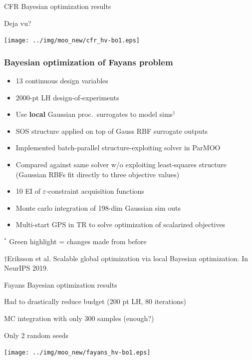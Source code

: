 \documentclass[aspectratio=169]{beamer}
\begin{document}
\begin{frame}{CFR Bayesian optimization results}

Deja vu?\\
\begin{center}
\texttt{[image: ../img/moo\_new/cfr\_hv-bo1.eps]}
\end{center}
\end{frame}

\begin{frame}\frametitle{Bayesian optimization of Fayans problem}
\begin{itemize}
\item 13 continuous design variables
\item 2000-pt LH design-of-experiments
\item Use {\bf local} Gaussian proc.\ surrogates to model sims$^\dagger$
\item SOS structure applied on top of Gauss RBF surrogate outputs
\item Implemented batch-parallel
{\color{blue} structure-exploiting solver in ParMOO}
\item Compared against
{\color{red} same solver w/o exploiting least-squares structure}
(Gaussian RBFs fit directly to three objective values)
\item {\color{green}10 EI of $\varepsilon$-constraint acquisition functions}
\item {\color{green}Monte carlo integration of 198-dim Gaussian sim outs}
\item {\color{green}Multi-start GPS in TR to solve optimization of scalarized objectives}
\end{itemize}

\bigskip

$^*${\color{green} Green highlight} = changes made from before

\vfill

{\tiny\sl

$\dagger$Eriksson et al.
Scalable global optimization via local Bayesian optimization.
In NeurIPS 2019.

}
\end{frame}

\begin{frame}{Fayans Bayesian optimization results}

Had to drastically reduce budget (200 pt LH, 80 iterations)

\medskip

MC integration with only 300 samples (enough?)

\medskip

Only 2 random seeds

\medskip

\begin{center}
\texttt{[image: ../img/moo\_new/fayans\_hv-bo1.eps]}
\end{center}
\end{frame}
\end{document}
